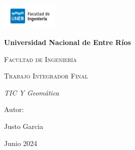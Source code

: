 \begin{titlepage}
    \centering
    {\includegraphics[width=0.2\textwidth]{Images/fiuner.png}\par}
    \vspace{1cm}
    {\bfseries\LARGE Universidad Nacional de Entre Ríos \par}
    \vspace{1cm}
    {\scshape\Large Facultad de Ingeniería \par}
    \vspace{3cm}
    {\scshape\Huge Trabajo Integrador Final\par}
    \vspace{0.5cm}
    {\itshape\Large TIC Y Geomática \par}
    \vfill
    {\Large Autor: \par}
    {\Large Justo Garcia \par}
    \vfill
    {\Large Junio 2024 \par}
\end{titlepage}
